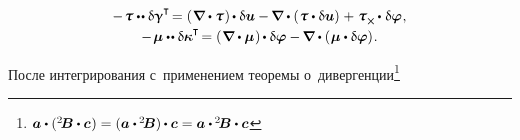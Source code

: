 \begin{otherlanguage}{russian}
\nopagebreak\vspace{-0.4em}\begin{equation*}
\begin{array}{c}
- \hspace{.2ex} \forcestresstensor \dotdotp \variation{\distortiontensor}^{\T} \hspace{-0.32ex}
= \left( \hspace{.12ex} \boldnabla \dotp \forcestresstensor \hspace{.12ex} \right) \hspace{-0.16ex} \dotp \variation{\fieldofdisplacements}
- \hspace{-0.15ex} \boldnabla \dotp \left( \hspace{.1ex} \forcestresstensor \dotp \variation{\fieldofdisplacements} \right) \hspace{.1ex}
+ \hspace{.1ex} \forcestresstensor_{\Xcompanion} \hspace{-0.1ex} \dotp \hspace{.1ex} \variation{\fieldofrotations} \hspace{.1ex} ,
\\[.25em]
%
- \hspace{.2ex} \couplestresstensor \dotdotp \variation{\wrynesstensor}^{\T} \hspace{-0.32ex}
= \left( \hspace{.12ex} \boldnabla \dotp \couplestresstensor \hspace{.12ex} \right) \hspace{-0.16ex} \dotp \variation{\fieldofrotations}
- \hspace{-0.15ex} \boldnabla \dotp \left( \hspace{.1ex} \couplestresstensor \dotp \variation{\fieldofrotations} \right) \hspace{-0.25ex} .
\end{array}
\end{equation*}

\vspace{-0.25em} \noindent После интегрирования с~применением теоремы о~дивергенции\footnote{${\bm{a} \dotp ({^2\!\bm{B}} \dotp \bm{c} \hspace{.1ex}) = (\bm{a} \dotp \hspace{-0.12ex} {^2\!\bm{B}}) \hspace{-0.1ex} \dotp \bm{c} = \bm{a} \dotp \hspace{-0.12ex} {^2\!\bm{B}} \dotp \bm{c}}$}


\end{otherlanguage}

